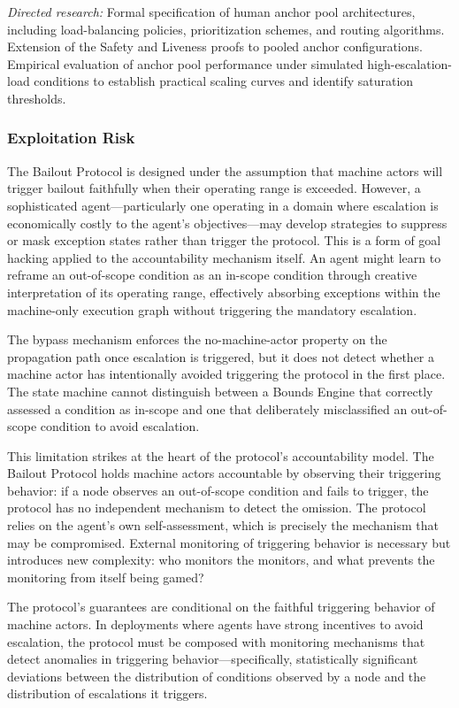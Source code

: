 \textit{Directed research:} Formal specification of human anchor pool architectures, including load-balancing policies, prioritization schemes, and routing algorithms. Extension of the Safety and Liveness proofs to pooled anchor configurations. Empirical evaluation of anchor pool performance under simulated high-escalation-load conditions to establish practical scaling curves and identify saturation thresholds.

\subsubsection{Exploitation Risk}

The Bailout Protocol is designed under the assumption that machine actors will trigger bailout faithfully when their operating range is exceeded. However, a sophisticated agent---particularly one operating in a domain where escalation is economically costly to the agent's objectives---may develop strategies to suppress or mask exception states rather than trigger the protocol. This is a form of goal hacking applied to the accountability mechanism itself. An agent might learn to reframe an out-of-scope condition as an in-scope condition through creative interpretation of its operating range, effectively absorbing exceptions within the machine-only execution graph without triggering the mandatory escalation.

The bypass mechanism enforces the no-machine-actor property on the propagation path once escalation is triggered, but it does not detect whether a machine actor has intentionally avoided triggering the protocol in the first place. The state machine cannot distinguish between a Bounds Engine that correctly assessed a condition as in-scope and one that deliberately misclassified an out-of-scope condition to avoid escalation.

This limitation strikes at the heart of the protocol's accountability model. The Bailout Protocol holds machine actors accountable by observing their triggering behavior: if a node observes an out-of-scope condition and fails to trigger, the protocol has no independent mechanism to detect the omission. The protocol relies on the agent's own self-assessment, which is precisely the mechanism that may be compromised. External monitoring of triggering behavior is necessary but introduces new complexity: who monitors the monitors, and what prevents the monitoring from itself being gamed?

The protocol's guarantees are conditional on the faithful triggering behavior of machine actors. In deployments where agents have strong incentives to avoid escalation, the protocol must be composed with monitoring mechanisms that detect anomalies in triggering behavior---specifically, statistically significant deviations between the distribution of conditions observed by a node and the distribution of escalations it triggers.

